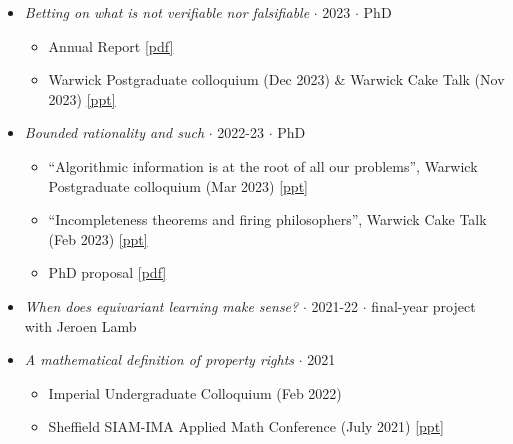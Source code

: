 \documentclass{article}
\begin{document}
\begin{itemize}

    \item \emph{Betting on what is not verifiable nor falsifiable} $\cdot$ 2023 $\cdot$ PhD
    
    \begin{itemize}
        \item Annual Report \href{https://drive.google.com/file/d/1qNZjvwNXTKl8KHc1_m-vPnJyWvpT_-yi/view?usp=sharing}{[pdf]}
        
        \item Warwick Postgraduate colloquium (Dec 2023) \& Warwick Cake Talk (Nov 2023) \href{https://drive.google.com/file/d/1qvkmYbPsZ9kVE1WPljcPSpXZq7wphDqt/view?usp=sharing}{[ppt]}
    \end{itemize}

    \item \emph{Bounded rationality and such} $\cdot$ 2022-23 $\cdot$ PhD

    \begin{itemize}
        \item ``Algorithmic information is at the root of all our problems'', Warwick Postgraduate colloquium (Mar 2023) \href{https://drive.google.com/file/d/1auYDhlsq1i0ZhTs3UsfuuUXYViS9UnqS/view?usp=sharing}{[ppt]}
        \item ``Incompleteness theorems and firing philosophers'', Warwick Cake Talk (Feb 2023) \href{https://drive.google.com/file/d/1IrAc8RWr6gsGurXND3baNWEGaEJP6Tjb/view?usp=sharing}{[ppt]}
        \item PhD proposal \href{https://drive.google.com/file/d/1EK045SAo025lGJtmkOOYI7sIzzIQF03K/view?usp=sharing}{[pdf]}
    \end{itemize}

    \item \emph{When does equivariant learning make sense?} $\cdot$ 2021-22 $\cdot$ final-year project with Jeroen Lamb
        
    \item \emph{A mathematical definition of property rights} $\cdot$ 2021 

    \begin{itemize}
        \item Imperial Undergraduate Colloquium (Feb 2022)
        \item Sheffield SIAM-IMA Applied Math Conference (July 2021) \href{https://drive.google.com/file/d/1AjYV2bo33F7Cm6vmzD1PBA_8L3cnMQ0S/view?usp=sharing}{[ppt]}
    \end{itemize}


\end{itemize}
\end{document}
